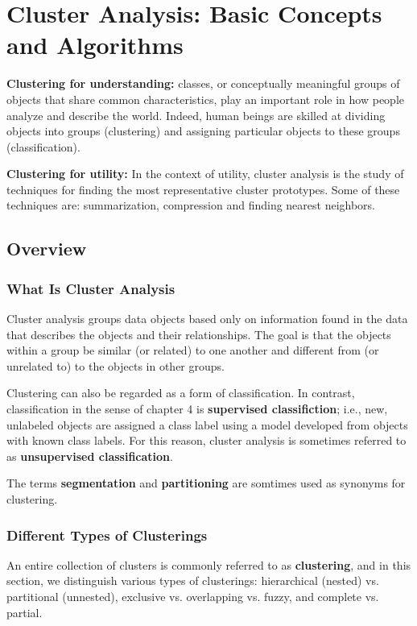 \chapter{Cluster Analysis: Basic Concepts and Algorithms}

{\bf Clustering for understanding:} classes, or conceptually meaningful groups of 
objects that share common characteristics, play an important role in how people 
analyze and describe the world. Indeed, human beings are skilled at dividing
objects into groups (clustering) and assigning particular objects to these 
groups (classification).

{\bf Clustering for utility:} In the context of utility, cluster analysis is the
study of techniques for finding the most representative cluster prototypes. 
Some of these techniques are: summarization, compression and finding nearest neighbors.

\clearpage
\section{Overview}
	
	\subsection{What Is Cluster Analysis}

	Cluster analysis groups data objects based only on information found in the 
	data that describes the objects and their relationships. The goal is that the
	objects within a group be similar (or related) to one another and different
	from (or unrelated to) to the objects in other groups. 

	Clustering can also be regarded as a form of classification.
	In contrast, classification in the sense of chapter 4 is {\bf supervised classifiction};
	i.e., new, unlabeled objects are assigned a class label using a model developed
	from objects with known class labels. For this reason, cluster analysis
	is sometimes referred to as {\bf unsupervised classification}.

	The terms {\bf segmentation} and {\bf partitioning} are somtimes used as
	synonyms for clustering.

	\subsection{Different Types of Clusterings}

		An entire collection of clusters is commonly referred to as {\bf clustering}, and
		in this section, we distinguish various types of clusterings: hierarchical (nested)
		vs. partitional (unnested), exclusive vs. overlapping vs. fuzzy, and complete vs. 
		partial. 

